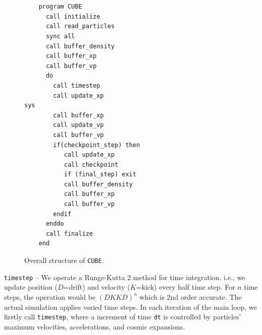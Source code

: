 \documentclass[10pt,twocolumn,preprint]{emulateapj}
\begin{document}
\begin{figure}[t]
\begin{verbatim}


    program CUBE
      call initialize
      call read_particles
      sync all
      call buffer_density
      call buffer_xp
      call buffer_vp
      do
        call timestep
        call update_xp
sys
        call buffer_xp
        call update_vp
        call buffer_vp
        if(checkpoint_step) then
           call update_xp
           call checkpoint
           if (final_step) exit
           call buffer_density
           call buffer_xp
           call buffer_vp
        endif
      enddo
      call finalize
    end
\end{verbatim}
\caption{Overall structure of {\tt CUBE}.}
\label{fig.code}
\end{figure}


{\tt timestep} --
We operate a Runge-Kutta 2 method for time integration. i.e., we update position ($D$=drift) and velocity ($K$=kick) every half time step. For $n$ time steps, the operation would be $(DKKD)^n$ which is 2nd order accurate. The actual simulation applies varied time steps. In each iteration of the main loop, we firstly call {\tt timestep}, where a increment of time {\tt dt} is controlled by particles' maximum velocities, accelerations, and cosmic expansions.
\end{document}
